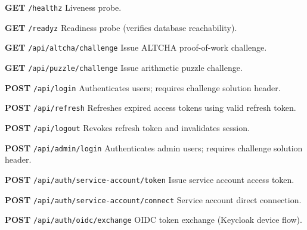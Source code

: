 \begin{tcolorbox}[colback=blue!5, colframe=blue!40, title=\textbf{Authentication \& Health Endpoints}]

\textbf{GET} \texttt{/healthz} \quad Liveness probe.

\vspace{0.2cm}

\textbf{GET} \texttt{/readyz} \quad Readiness probe (verifies database reachability).

\vspace{0.2cm}

\textbf{GET} \texttt{/api/altcha/challenge} \quad Issue ALTCHA proof-of-work challenge.

\vspace{0.2cm}

\textbf{GET} \texttt{/api/puzzle/challenge} \quad Issue arithmetic puzzle challenge.

\vspace{0.2cm}

\textbf{POST} \texttt{/api/login} \quad Authenticates users; requires challenge solution header.

\vspace{0.2cm}

\textbf{POST} \texttt{/api/refresh} \quad Refreshes expired access tokens using valid refresh token.

\vspace{0.2cm}

\textbf{POST} \texttt{/api/logout} \quad Revokes refresh token and invalidates session.

\vspace{0.2cm}

\textbf{POST} \texttt{/api/admin/login} \quad Authenticates admin users; requires challenge solution header.

\vspace{0.2cm}

\textbf{POST} \texttt{/api/auth/service-account/token} \quad Issue service account access token.

\vspace{0.2cm}

\textbf{POST} \texttt{/api/auth/service-account/connect} \quad Service account direct connection.

\vspace{0.2cm}

\textbf{POST} \texttt{/api/auth/oidc/exchange} \quad OIDC token exchange (Keycloak device flow).

\end{tcolorbox}

